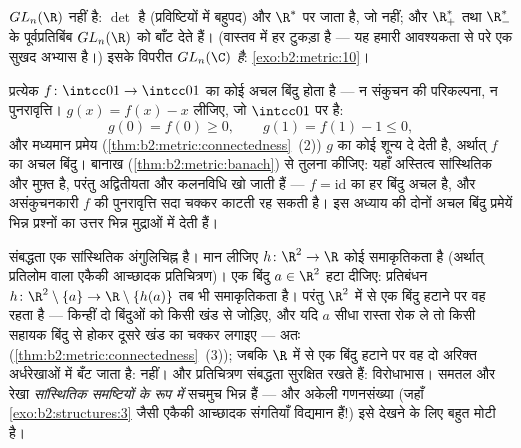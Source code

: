 \begin{example}\label{ex:b2:metric:glnr}
$GL_n(\R)$  नहीं है: $\det$  है (प्रविष्टियों में बहुपद) और $\R^*$ पर
जाता है, जो  नहीं; और $\R_+^*$ तथा $\R_-^*$ के पूर्वप्रतिबिंब $GL_n(\R)$ को बाँट
देते हैं। (वास्तव में हर टुकड़ा  है --- यह हमारी आवश्यकता से
परे एक सुखद अभ्यास है।) इसके विपरीत $GL_n(\C)$  \emph{है}: \cref{exo:b2:metric:10}।
\end{example}

\begin{example}[केवल संबद्धता से एक अचल बिंदु]\label{ex:b2:metric:ivtfixed}
प्रत्येक  $f \colon \intcc01 \to \intcc01$ का कोई अचल बिंदु होता है --- न संकुचन की परिकल्पना,
न पुनरावृत्ति। $g(x) = f(x) - x$ लीजिए, जो  $\intcc01$ पर  है:
\[
g(0) = f(0) \geq 0,
\qquad
g(1) = f(1) - 1 \leq 0 ,
\]
और मध्यमान प्रमेय (\cref{thm:b2:metric:connectedness}~(2)) $g$ का कोई शून्य दे देती है, अर्थात् $f$
का अचल बिंदु। बानाख (\cref{thm:b2:metric:banach}) से तुलना कीजिए: यहाँ अस्तित्व सांस्थितिक और
मुफ़्त है, परंतु अद्वितीयता और कलनविधि खो जाती हैं --- $f =
\mathrm{id}$ का हर बिंदु
अचल है, और असंकुचनकारी $f$ की पुनरावृत्ति सदा चक्कर काटती रह सकती है।
इस अध्याय की दोनों अचल बिंदु प्रमेयें भिन्न प्रश्नों का उत्तर भिन्न
मुद्राओं में देती हैं।
\end{example}

\begin{example}[$\R$ और $\R^2$ समाकृतिक नहीं हैं]\label{ex:b2:metric:rnotr2}
संबद्धता एक सांस्थितिक अंगुलिचिह्न है। मान लीजिए $h \colon
\R^2 \to \R$ कोई समाकृतिकता है
(अर्थात्  प्रतिलोम वाला  एकैकी आच्छादक प्रतिचित्रण)। एक बिंदु
$a \in \R^2$ हटा दीजिए: प्रतिबंधन $h \colon \R^2\setminus\{a\} \to
\R\setminus\{h(a)\}$ तब भी समाकृतिकता है। परंतु $\R^2$ में से एक
बिंदु हटाने पर वह  रहता है --- किन्हीं दो बिंदुओं को किसी खंड
से जोड़िए, और यदि $a$ सीधा रास्ता रोक ले तो किसी सहायक बिंदु से होकर
दूसरे खंड का चक्कर लगाइए --- अतः  (\cref{thm:b2:metric:connectedness}~(3)); जबकि $\R$ में से एक
बिंदु हटाने पर वह दो अरिक्त  अर्धरेखाओं में बँट जाता है: 
नहीं। और  प्रतिचित्रण संबद्धता सुरक्षित रखते हैं: विरोधाभास। समतल
और रेखा \emph{सांस्थितिक समष्टियों के रूप में} सचमुच भिन्न हैं --- और
अकेली गणनसंख्या (जहाँ \cref{exo:b2:structures:3} जैसी एकैकी आच्छादक संगतियाँ विद्यमान हैं!)
इसे देखने के लिए बहुत मोटी है।
\end{example}

